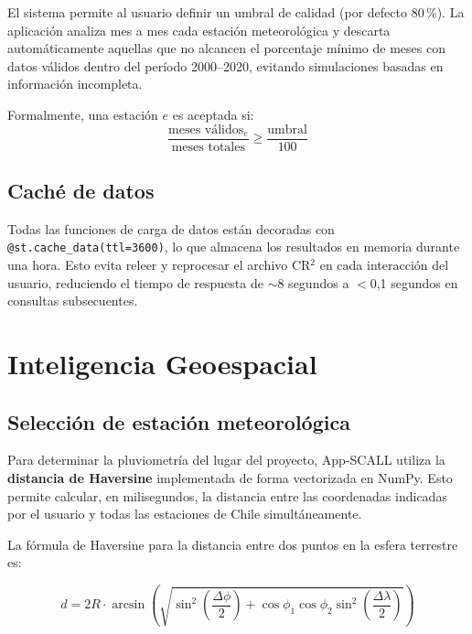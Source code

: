 \documentclass[12pt, a4paper]{article}
\begin{document}
El sistema permite al usuario definir un umbral de calidad (por defecto 80\,\%). La aplicación analiza mes a mes cada estación meteorológica y descarta automáticamente aquellas que no alcancen el porcentaje mínimo de meses con datos válidos dentro del período 2000--2020, evitando simulaciones basadas en información incompleta.

Formalmente, una estación $e$ es aceptada si:
\begin{equation}
    \frac{\text{meses válidos}_e}{\text{meses totales}} \geq \frac{\text{umbral}}{100}
\end{equation}

\subsection{Caché de datos}

Todas las funciones de carga de datos están decoradas con \texttt{@st.cache\_data(ttl=3600)}, lo que almacena los resultados en memoria durante una hora. Esto evita releer y reprocesar el archivo CR$^2$ en cada interacción del usuario, reduciendo el tiempo de respuesta de $\sim$8 segundos a $<$0,1 segundos en consultas subsecuentes.

\section{Inteligencia Geoespacial}

\subsection{Selección de estación meteorológica}

Para determinar la pluviometría del lugar del proyecto, App-SCALL utiliza la \textbf{distancia de Haversine} implementada de forma vectorizada en NumPy. Esto permite calcular, en milisegundos, la distancia entre las coordenadas indicadas por el usuario y todas las estaciones de Chile simultáneamente.

La fórmula de Haversine para la distancia entre dos puntos en la esfera terrestre es:

\begin{equation}
    d = 2R \cdot \arcsin\!\left(\sqrt{\sin^2\!\left(\frac{\Delta\phi}{2}\right) + \cos\phi_1\cos\phi_2\sin^2\!\left(\frac{\Delta\lambda}{2}\right)}\right)
\end{equation}
\end{document}
